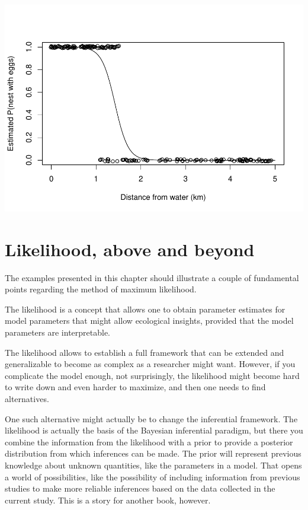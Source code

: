 \documentclass[
]{book}
\begin{document}
\includegraphics{ECOMODbook_files/figure-latex/unnamed-chunk-4-1.pdf}

\hypertarget{likelihood-above-and-beyond}{%
\section{Likelihood, above and beyond}\label{likelihood-above-and-beyond}}

The examples presented in this chapter should illustrate a couple of fundamental points regarding the method of maximum likelihood.

The likelihood is a concept that allows one to obtain parameter estimates for model parameters that might allow ecological insights, provided that the model parameters are interpretable.

The likelihood allows to establish a full framework that can be extended and generalizable to become as complex as a researcher might want. However, if you complicate the model enough, not surprisingly, the likelihood might become hard to write down and even harder to maximize, and then one needs to find alternatives.

One such alternative might actually be to change the inferential framework. The likelihood is actually the basis of the Bayesian inferential paradigm, but there you combine the information from the likelihood with a prior to provide a posterior distribution from which inferences can be made. The prior will represent previous knowledge about unknown quantities, like the parameters in a model. That opens a world of possibilities, like the possibility of including information from previous studies to make more reliable inferences based on the data collected in the current study. This is a story for another book, however.
\end{document}
